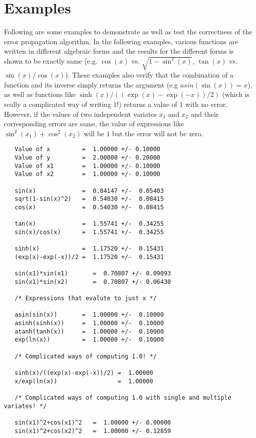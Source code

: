 \documentclass[11pt]{article}
\begin{document}
\section{Examples}
\label{SEC:EXAMPLES}
Following are some examples to demonstrate as well as test the
correctness of the error propagation algorithm.  In the following examples, various
functions are written in different algebraic forms and the results for
the different forms is shown to be exactly same (e.g. $\cos(x)$ vs.
$\sqrt{1-\sin^2(x)}$, $\tan(x)$ vs. $\sin(x)/\cos(x)$).  These
examples also verify that the combination of a function and its
inverse simply returns the argument (e.g $asin(\sin(x))=x$), as well
as functions like $\sinh(x)/((\exp(x)-\exp(-x))/2)$ (which is really a
complicated way of writing $1$!) returns a value of $1$ with no error.
However, if the values of two independent variates $x_1$ and $x_2$ and
their corresponding errors are same, the value of expressions like
$\sin^2(x_1) + \cos^2(x_2)$ will be $1$ but the error will not be zero.
\begin{verbatim}
   Value of x         =  1.00000 +/- 0.10000
   Value of y         =  2.00000 +/- 0.20000
   Value of x1        =  1.00000 +/- 0.10000
   Value of x2        =  1.00000 +/- 0.10000

   sin(x)             =  0.84147 +/-  0.05403
   sqrt(1-sin(x)^2)   =  0.54030 +/-  0.08415
   cos(x)             =  0.54030 +/-  0.08415

   tan(x)             =  1.55741 +/-  0.34255
   sin(x)/cos(x)      =  1.55741 +/-  0.34255

   sinh(x)            =  1.17520 +/-  0.15431
   (exp(x)-exp(-x))/2 =  1.17520 +/-  0.15431

   sin(x1)*sin(x1)       =  0.70807 +/- 0.09093
   sin(x1)*sin(x2)       =  0.70807 +/- 0.06430

   /* Expressions that evalute to just x */

   asin(sin(x))       =  1.00000 +/-  0.10000
   asinh(sinh(x))     =  1.00000 +/-  0.10000
   atanh(tanh(x))     =  1.00000 +/-  0.10000
   exp(ln(x))         =  1.00000 +/-  0.10000

   /* Complicated ways of computing 1.0! */

   sinh(x)/((exp(x)-exp(-x))/2) =  1.00000 
   x/exp(ln(x))                 =  1.00000

   /* Complicated ways of computing 1.0 with single and multiple variates! */

   sin(x1)^2+cos(x1)^2   =  1.00000 +/- 0.00000
   sin(x1)^2+cos(x2)^2   =  1.00000 +/- 0.12859
\end{verbatim}
\end{document}
